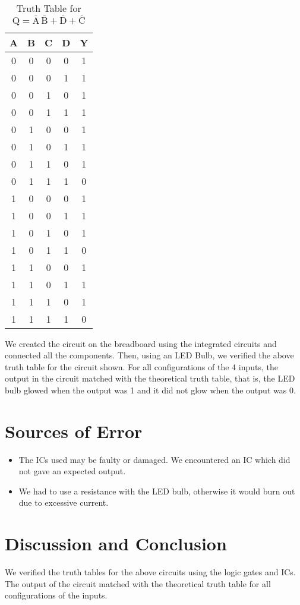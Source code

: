 \documentclass{scrartcl}
\begin{document}
\begin{table}[H]
    \centering
    \caption{Truth Table for \(\mathrm{ \mathrm{Q} = \overline{A}\,\overline{B} + \overline{D} + \overline{C} }\)}
    \vspace{0.2cm}
    \begin{tabular}{|c|c|c|c||c|}
    \hline
    \textbf{A} & \textbf{B} & \textbf{C} & \textbf{D} & \textbf{Y} \\
    \hline
    0 & 0 & 0 & 0 & 1 \\
    0 & 0 & 0 & 1 & 1 \\
    0 & 0 & 1 & 0 & 1 \\
    0 & 0 & 1 & 1 & 1 \\
    0 & 1 & 0 & 0 & 1 \\
    0 & 1 & 0 & 1 & 1 \\
    0 & 1 & 1 & 0 & 1 \\
    0 & 1 & 1 & 1 & 0 \\
    1 & 0 & 0 & 0 & 1 \\
    1 & 0 & 0 & 1 & 1 \\
    1 & 0 & 1 & 0 & 1 \\
    1 & 0 & 1 & 1 & 0 \\
    1 & 1 & 0 & 0 & 1 \\
    1 & 1 & 0 & 1 & 1 \\
    1 & 1 & 1 & 0 & 1 \\
    1 & 1 & 1 & 1 & 0 \\
    \hline
    \end{tabular}
    \end{table}
    \noindent
    We created the circuit on the breadboard using the integrated circuits and connected all the components. Then, using an LED Bulb, we verified the above truth table for the circuit shown. For all configurations of the 4 inputs, the output in the circuit matched with the theoretical truth table, that is, the LED bulb glowed when the output was 1 and it did not glow when the output was 0. 
\section{Sources of Error}
\begin{itemize}
    \item The ICs used may be faulty or damaged. We encountered an IC which did not gave an expected output. 
    \item We had to use a resistance with the LED bulb, otherwise it would burn out due to excessive current. 
\end{itemize}
\section{Discussion and Conclusion}
We verified the truth tables for the above circuits using the logic gates and ICs. The output of the circuit matched with the theoretical truth table for all configurations of the inputs. 
\end{document}
